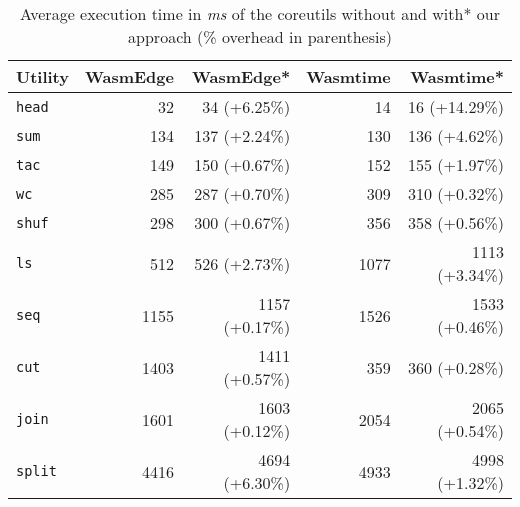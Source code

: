 \begin{table}[!t]
	\setlength{\tabcolsep}{0.38cm}
	\begin{tabular*}{\columnwidth}{l r r r r}
		\toprule
		{\bf Utility} & {\bf WasmEdge} & {\bf WasmEdge*} & {\bf Wasmtime} & {\bf Wasmtime*}\\
		\midrule
		{\tt head}  &   32 &   34 (+6.25\%) &   14 &   16 (+14.29\%) \\
		{\tt sum}   &  134 &  137 (+2.24\%) &  130 &  136  (+4.62\%) \\
		{\tt tac}   &  149 &  150 (+0.67\%) &  152 &  155  (+1.97\%) \\
		{\tt wc}    &  285 &  287 (+0.70\%) &  309 &  310  (+0.32\%) \\
		{\tt shuf}  &  298 &  300 (+0.67\%) &  356 &  358  (+0.56\%) \\
		{\tt ls}    &  512 &  526 (+2.73\%) & 1077 & 1113  (+3.34\%) \\
		{\tt seq}   & 1155 & 1157 (+0.17\%) & 1526 & 1533  (+0.46\%) \\
		{\tt cut}   & 1403 & 1411 (+0.57\%) &  359 &  360  (+0.28\%) \\
		{\tt join}  & 1601 & 1603 (+0.12\%) & 2054 & 2065  (+0.54\%) \\
		{\tt split} & 4416 & 4694 (+6.30\%) & 4933 & 4998  (+1.32\%) \\
		\bottomrule
	\end{tabular*}
	\caption[Average execution time of coreutils with and without our approach]{
		\label{table:exp} Average execution time in {\em ms} of the
		coreutils without and with* our approach (\% overhead in
		parenthesis)
	}
\end{table}
